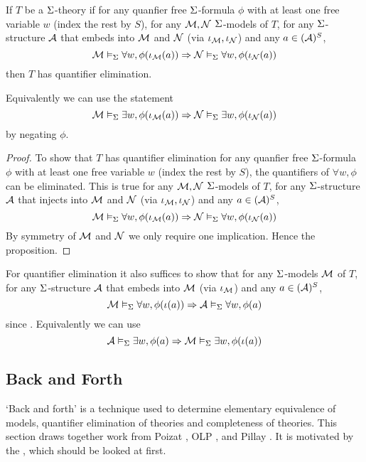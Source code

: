 \begin{cor}
    If $T$ be a $\Si$-theory if
    for any quanfier free $\Si$-formula $\phi$ with at least one free variable
    $w$ (index the rest by $S$),
    for any $\MM, \NN$ $\Si$-models of $T$, for any $\Si$-structure $\AA$ 
    that embeds into $\MM$ and $\NN$ (via $\io_\MM,\io_\NN$) and 
    any $a \in ({\AA})^S$,
    \[\MM \model{\Si} \forall w, \phi(\io_{\MM}(a)) \implies 
    \NN \model{\Si} \forall w, \phi(\io_\NN (a))\]
    then $T$ has quantifier elimination.

    Equivalently we can use the statement 
    \[\MM \model{\Si} \exists w, \phi(\io_{\MM}(a)) \implies 
    \NN \model{\Si} \exists w, \phi(\io_\NN (a))\]
    by negating $\phi$.
\end{cor}
\begin{proof}
    To show that $T$ has quantifier elimination
    for any quanfier free $\Si$-formula $\phi$ with at least one free variable
    $w$ (index the rest by $S$), 
    the quantifiers of $\forall w, \phi$ can be eliminated.
    This is true  for any 
    $\MM, \NN$ $\Si$-models of $T$, 
    for any $\Si$-structure $\AA$ 
    that injects into $\MM$ and $\NN$ (via $\io_\MM,\io_\NN$) and 
    any $a \in (\AA)^S$,
    \[\MM \model{\Si} \forall w, \phi(\io_{\MM}(a)) \implies 
    \NN \model{\Si} \forall w, \phi(\io_\NN (a))\]
    By symmetry of $\MM$ and $\NN$ we only require one implication.
    Hence the proposition.
\end{proof}
\begin{rmk}
    For quantifier elimination it also suffices to show that for any 
    $\Si$-models $\MM$ of $T$, for any $\Si$-structure $\AA$ 
    that embeds into $\MM$ (via $\io_\MM$) and 
    any $a \in ({\AA})^S$,
    \[\MM \model{\Si} \forall w, \phi(\io(a)) \implies 
    \AA \model{\Si} \forall w, \phi(a)\]
    since .
    Equivalently we can use
    \[\AA \model{\Si} \exists w, \phi(a) \implies 
    \MM \model{\Si} \exists w, \phi(\io(a))\]
\end{rmk}

\subsection{Back and Forth}
`Back and forth' is a technique used to determine 
elementary equivalence of models,
quantifier elimination of theories
and completeness of theories.
This section draws together work from Poizat \cite{poizat}, 
OLP \cite{openlogicproject},
and Pillay \cite{pillay}.
It is motivated by the , 
which should be looked at first.

